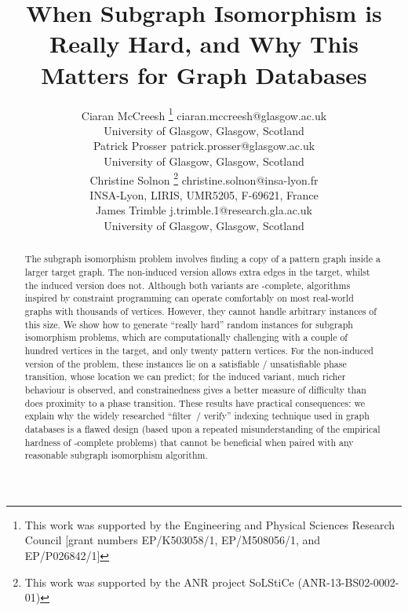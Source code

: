 \documentclass[twoside,11pt]{article}
\newcommand*\samethanks[1][\value{footnote}]{\footnotemark[#1]}
\begin{document}
\title{When Subgraph Isomorphism is Really Hard, and Why This Matters for Graph
Databases}

\author{\name Ciaran McCreesh \thanks{This work was supported by the Engineering and Physical Sciences
           Research Council [grant numbers EP/K503058/1, EP/M508056/1, and EP/P026842/1]} \email
           ciaran.mccreesh@glasgow.ac.uk \\
       \addr University of Glasgow, Glasgow, Scotland \\
       \name Patrick Prosser \samethanks[1] \email patrick.prosser@glasgow.ac.uk \\
       \addr University of Glasgow, Glasgow, Scotland \\
       \name Christine Solnon \thanks{This work was supported
       by the ANR project SoLStiCe (ANR-13-BS02-0002-01)} \email christine.solnon@insa-lyon.fr \\
       \addr INSA-Lyon, LIRIS, UMR5205, F-69621, France \\
       \name James Trimble \samethanks[1] \email j.trimble.1@research.gla.ac.uk \\
       \addr University of Glasgow, Glasgow, Scotland}
\maketitle

\begin{abstract}
    The subgraph isomorphism problem involves finding a copy of a pattern graph inside a larger
    target graph. The non-induced version allows extra edges in the target, whilst the induced
    version does not.  Although both variants are \NP-complete, algorithms inspired by constraint programming
    can operate comfortably on most real-world graphs with thousands of vertices.  However, they
    cannot handle arbitrary instances of this size. We show how to generate ``really hard'' random
    instances for subgraph isomorphism problems, which are computationally challenging with a couple
    of hundred vertices in the target, and only twenty pattern vertices. For the non-induced version
    of the problem, these instances lie on a satisfiable / unsatisfiable phase transition, whose
    location we can predict; for the induced variant, much richer behaviour is observed, and
    constrainedness gives a better measure of difficulty than does proximity to a phase transition.
    These results have practical consequences: we explain why the widely researched ``filter~/
    verify'' indexing technique used in graph databases is a flawed design (based upon a repeated
    misunderstanding of the empirical hardness of \NP-complete problems) that cannot be beneficial
    when paired with any reasonable subgraph isomorphism algorithm.
\end{abstract}
\end{document}
